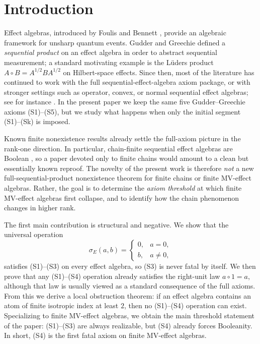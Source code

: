 \documentclass[11pt]{article}
\theoremstyle{definition}
\theoremstyle{remark}
\numberwithin{equation}{section}
\begin{document}
\section{Introduction}
Effect algebras, introduced by Foulis and Bennett \cite{FoulisBennett1994}, provide an algebraic framework for unsharp quantum events. Gudder and Greechie \cite{GudderGreechie2002} defined a \emph{sequential product} on an effect algebra in order to abstract sequential measurement; a standard motivating example is the L\"uders product $A\circ B=A^{1/2}BA^{1/2}$ on Hilbert-space effects. Since then, most of the literature has continued to work with the full sequential-effect-algebra axiom package, or with stronger settings such as operator, convex, or normal sequential effect algebras; see for instance \cite{GudderGreechie2005,vandeWetering2018,WesterbaanEtAl2020,JencovaPulmannova2023}. In the present paper we keep the same five Gudder--Greechie axioms \textup{(S1)}--\textup{(S5)}, but we study what happens when only the initial segment \textup{(S1)}--\textup{(Sk)} is imposed.

Known finite nonexistence results already settle the full-axiom picture in the rank-one direction. In particular, chain-finite sequential effect algebras are Boolean \cite{Tkadlec2008}, so a paper devoted only to finite chains would amount to a clean but essentially known reproof. The novelty of the present work is therefore \emph{not} a new full-sequential-product nonexistence theorem for finite chains or finite MV-effect algebras. Rather, the goal is to determine the \emph{axiom threshold} at which finite MV-effect algebras first collapse, and to identify how the chain phenomenon changes in higher rank.

The first main contribution is structural and negative. We show that the universal operation
\[
\sigma_E(a,b)=
\begin{cases}
0,& a=0,\\
b,& a\neq 0,
\end{cases}
\]
satisfies \textup{(S1)}--\textup{(S3)} on every effect algebra, so \textup{(S3)} is never fatal by itself. We then prove that any \textup{(S1)}--\textup{(S4)} operation already satisfies the right-unit law $a\circ 1=a$, although that law is usually viewed as a standard consequence of the full axioms. From this we derive a local obstruction theorem: if an effect algebra contains an atom of finite isotropic index at least $2$, then no \textup{(S1)}--\textup{(S4)} operation can exist. Specializing to finite MV-effect algebras, we obtain the main threshold statement of the paper: \textup{(S1)}--\textup{(S3)} are always realizable, but \textup{(S4)} already forces Booleanity. In short, \textup{(S4)} is the first fatal axiom on finite MV-effect algebras.
\end{document}
